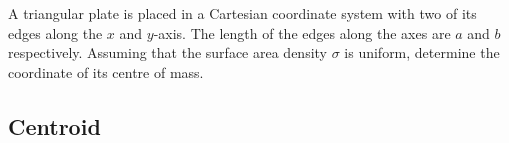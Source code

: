 \begin{example}
  A triangular plate is placed in a Cartesian coordinate system with two of its
  edges along the $x$ and $y$-axis. The length of the edges along the axes are
  $a$ and $b$ respectively. Assuming that the surface area density $\sigma$ is
  uniform, determine the coordinate of its centre of mass.
  \begin{center}
  \end{center}
\end{example}


\subsection{Centroid}


